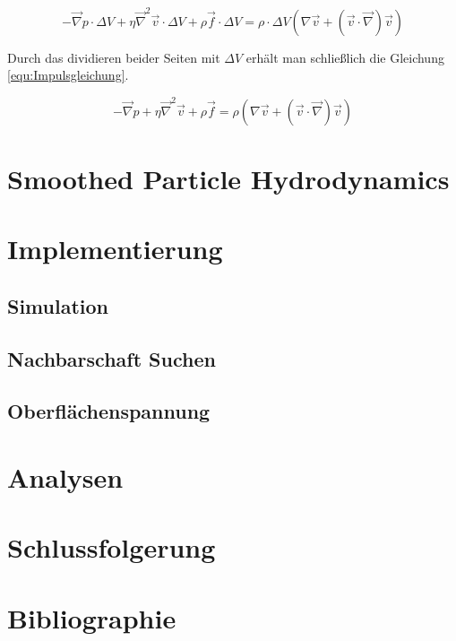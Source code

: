 \documentclass[a4paper, 12pt]{article}
\begin{document}
\[- \vec{\nabla}p \cdot \Delta V + \eta \vec{\nabla}^2 \vec{v} \cdot \Delta V + \rho \vec{f} \cdot \Delta V = \rho \cdot \Delta V (\nabla \vec{v} + (\vec{v} \cdot \vec{\nabla})\vec{v})\]

Durch das dividieren beider Seiten mit $\Delta V$ erhält man schließlich die Gleichung \eqref{equ:Impulsgleichung}.

\[- \vec{\nabla}p + \eta \vec{\nabla}^2 \vec{v} + \rho \vec{f} = \rho (\nabla \vec{v} + (\vec{v} \cdot \vec{\nabla})\vec{v})\]

\section{Smoothed Particle Hydrodynamics} \label{section_2}

\section{Implementierung} \label{section_3}
\subsection{Simulation}
\subsection{Nachbarschaft Suchen}
\subsection{Oberflächenspannung}

\section{Analysen} \label{section_4}

\section{Schlussfolgerung}

\section{Bibliographie}
\end{document}
